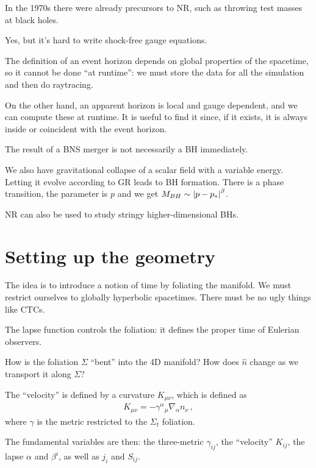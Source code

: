 \documentclass[main.tex]{subfiles}
\begin{document}
In the 1970s there were already precursors to NR, such as throwing test masses at black holes. 


Yes, but it's hard to write shock-free gauge equations. 

The definition of an event horizon depends on global properties of the spacetime, so it cannot be done ``at runtime'': we must store the data for all the simulation and then do raytracing. 

On the other hand, an apparent horizon is local and gauge dependent, and we can compute these at runtime. It is useful to find it since, if it exists, it is always inside or coincident with the event horizon. 

The result of a BNS merger is not necessarily a BH immediately. 

We also have gravitational collapse of a scalar field with a variable energy. Letting it evolve according to GR leads to BH formation. 
There is a phase transition, the parameter is \(p\) and we get \(M_{BH}\sim \abs{p - p_*}^{\beta }\). 


NR can also be used to study stringy higher-dimensional BHs. 

\section{Setting up the geometry}

The idea is to introduce a notion of time by foliating the manifold. 
We must restrict ourselves to globally hyperbolic spacetimes. 
There must be no ugly things like CTCs. 

The lapse function controls the foliation: it defines the proper time of Eulerian observers. 

How is the foliation \(\Sigma \) ``bent'' into the 4D manifold? How does \(\hat{n}\) change as we transport it along \(\Sigma \)? 

The ``velocity'' is defined by a curvature \(K_{\mu \nu }\), which is defined as 
%
\begin{align}
K_{\mu \nu } = - \gamma^{\alpha }{}_{\mu } \nabla_{\alpha } n_\nu 
\,,
\end{align}
%
where \(\gamma \) is the metric restricted to the \(\Sigma _t\) foliation. 

The fundamental variables are then: the three-metric \(\gamma_{ij}\), the ``velocity'' \(K_{ij}\), the lapse \(\alpha \) and \(\beta^{i}\), as well as \(j_i\) and \(S_{ij}\). 
\end{document}
